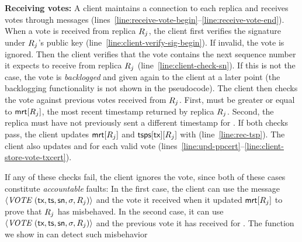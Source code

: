 \textbf{Receiving votes:} A client maintains a connection to each replica and receives votes through  messages (lines~\ref{line:receive-vote-begin}--\ref{line:receive-vote-end}).
When a vote is received from replica $R_j$, the client first verifies the signature \sig under $R_j$'s public key (line~\ref{line:client-verify-sig-begin}). If invalid, the vote is ignored.
Then the client verifies that the vote contains the next sequence number it expects to receive from replica $R_j$ (line~\ref{line:client-check-sn}). If this is not the case, the vote is \emph{backlogged} and given again to the client at a later point (the backlogging functionality is not shown in the pseudocode).
The client then checks the vote against previous votes received from $R_j$.
First, \tsp must be greater or equal to $\textsf{mrt}[R_j]$, the most recent timestamp returned by replica $R_j$.
Second, the replica must have not previously sent a different timestamp for \tx.
If both checks pass, the client updates $\textsf{mrt}[R_j]$ and $\textsf{tsps}[\textsf{tx}][R_j]$ with \tsp (line~\ref{line:rec-tsp}).
The client also updates \ppcert and \alltxcert for each valid vote (lines~\ref{line:upd-ppcert}--\ref{line:client-store-vote-txcert}).

If any of these checks fail, the client ignores the vote, since both of these cases constitute \emph{accountable} faults: In the first case, the client can use the message $\msgrecord{(\tx, \tsp, \sn, \sig, \rep_j)}$ and the vote it received when it updated $\textsf{mrt}[R_j]$ to prove that $R_j$ has misbehaved. In the second case, it can use $\msgrecord{(\tx, \tsp, \sn, \sig, \rep_j)}$ and the previous vote it has received for \tx.
The \identify{} function we show in  can detect such misbehavior




